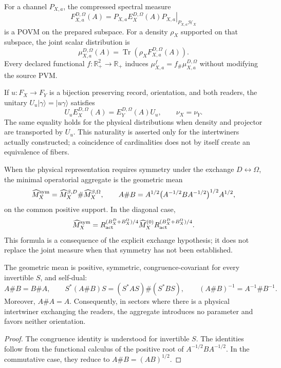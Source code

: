 For a channel \(P_{X,a}\), the compressed spectral measure
\[
 F_{X,a}^{D,\Omega}(A)
 =\left.P_{X,a}E_X^{D,\Omega}(A)P_{X,a}\right|_{P_{X,a}\mathcal H_X}
\]
is a POVM on the prepared subspace. For a density \(\rho_X\)
supported on that subspace, the joint scalar distribution is
\[
 \mu_{X,a}^{D,\Omega}(A)
 =\operatorname{Tr}\!\left(
 \rho_X F_{X,a}^{D,\Omega}(A)
 \right).
\]
Every declared functional \(f:\mathbb R_+^2\to\mathbb R_+\) induces
\(\mu_{X,a}^f=f_\#\mu_{X,a}^{D,\Omega}\) without modifying the source PVM.

If \(u:F_X\to F_Y\) is a bijection preserving record, orientation, and
both readers, the unitary \(U_u|\gamma\rangle=|u\gamma\rangle\) satisfies
\[
 U_uE_X^{D,\Omega}(A)=E_Y^{D,\Omega}(A)U_u,
 \qquad
 \nu_X=\nu_Y.
\]
The same equality holds for the physical distributions when density and
projector are transported by \(U_u\). This naturality is asserted only for
the intertwiners actually constructed; a coincidence of
cardinalities does not by itself create an equivalence of fibers.

When the physical representation requires symmetry under the exchange
\(D\leftrightarrow\Omega\), the minimal operatorial aggregate is the geometric
mean
\[
 \widehat M_X^{\rm sym}
 =\widehat M_X^{\beta,D}\#\widehat M_X^{\beta,\Omega},
 \qquad
 A\#B
 =A^{1/2}\bigl(A^{-1/2}BA^{-1/2}\bigr)^{1/2}A^{1/2},
\]
on the common positive support. In the diagonal case,
\[
 \widehat M_X^{\rm sym}
 =R_{\rm act}^{(B_X^D+B_X^\Omega)/4}
  \widehat M_X^{(0)}
  R_{\rm act}^{(B_X^D+B_X^\Omega)/4}.
\]
This formula is a consequence of the explicit exchange hypothesis; it does not
replace the joint measure when that symmetry has not been established.

\begin{theorem}
The geometric mean is positive, symmetric, congruence-covariant for
every invertible \(S\), and self-dual:
\[
 A\#B=B\#A,
 \qquad
 S^*(A\#B)S=(S^*AS)\#(S^*BS),
 \qquad
 (A\#B)^{-1}=A^{-1}\#B^{-1}.
\]
Moreover, \(A\#A=A\). Consequently, in sectors where there is a
physical intertwiner exchanging the readers, the aggregate introduces no
parameter and favors neither orientation.
\end{theorem}

\begin{proof}
The congruence identity is understood for invertible \(S\). The identities
follow from the functional calculus of the positive root of
\(A^{-1/2}BA^{-1/2}\). In the commutative case, they reduce to
\(A\#B=(AB)^{1/2}\).
\end{proof}

